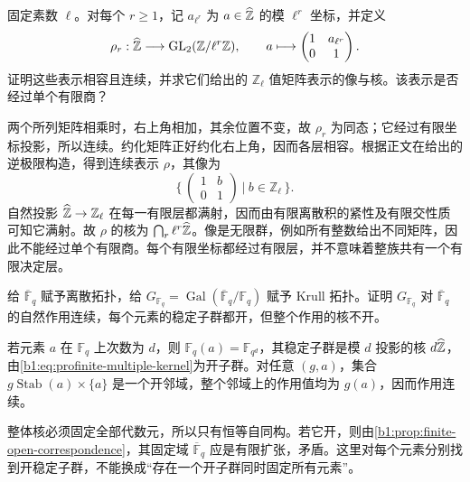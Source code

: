\begin{exercise}\label{b1:ex:22-15}
	固定素数 \(\ell\)。对每个 \(r\geq1\)，记 \(a_{\ell^r}\) 为 \(a\in\widehat{\vphantom{Z}\mathbb Z}\) 的模 \(\ell^r\) 坐标，并定义
	\[
		\rho_r:\widehat{\vphantom{Z}\mathbb Z}\longrightarrow \operatorname{GL}_2(\mathbb Z/\ell^r\mathbb Z),\qquad
		a\longmapsto\begin{pmatrix}1&a_{\ell^r}\\0&1\end{pmatrix}.
	\]
	证明这些表示相容且连续，并求它们给出的 \(\mathbb Z_\ell\) 值矩阵表示的像与核。该表示是否经过单个有限商？
\end{exercise}
\begin{solution}
	两个所列矩阵相乘时，右上角相加，其余位置不变，故 \(\rho_r\) 为同态；它经过有限坐标投影，所以连续。约化矩阵正好约化右上角，因而各层相容。根据正文在给出的逆极限构造，得到连续表示 \(\rho\)，其像为
	\[
		\Biggl\{\,\begin{pmatrix}1&b\\0&1\end{pmatrix}\ \Bigg|\ b\in\mathbb Z_\ell\,\Biggr\}.
	\]
	自然投影 \(\widehat{\vphantom{Z}\mathbb Z}\rightarrow\mathbb Z_\ell\) 在每一有限层都满射，因而由有限离散积的紧性及有限交性质可知它满射。故 \(\rho\) 的核为 \(\bigcap_r\ell^r\widehat{\vphantom{Z}\mathbb Z}\)。像是无限群，例如所有整数给出不同矩阵，因此不能经过单个有限商。每个有限坐标都经过有限层，并不意味着整族共有一个有限决定层。
\end{solution}

\begin{exercise}\label{b1:ex:22-16}
	给 \(\overline{\mathbb F}_q\) 赋予离散拓扑，给 \(G_{\mathbb F_q}=\operatorname{Gal}(\overline{\mathbb F}_q/\mathbb F_q)\) 赋予 Krull 拓扑。证明 \(G_{\mathbb F_q}\) 对 \(\overline{\mathbb F}_q\) 的自然作用连续，每个元素的稳定子群都开，但整个作用的核不开。
\end{exercise}
\begin{solution}
	若元素 \(a\) 在 \(\mathbb F_q\) 上次数为 \(d\)，则 \(\mathbb F_q(a)=\mathbb F_{q^d}\)，其稳定子群是模 \(d\) 投影的核 \(d\widehat{\vphantom{Z}\mathbb Z}\)，由\eqref{b1:eq:profinite-multiple-kernel}为开子群。对任意 \((g,a)\)，集合 \(g\operatorname{Stab}(a)\times\{a\}\) 是一个开邻域，整个邻域上的作用值均为 \(g(a)\)，因而作用连续。

	整体核必须固定全部代数元，所以只有恒等自同构。若它开，则由\cref{b1:prop:finite-open-correspondence}，其固定域 \(\overline{\mathbb F}_q\) 应是有限扩张，矛盾。这里对每个元素分别找到开稳定子群，不能换成“存在一个开子群同时固定所有元素”。
\end{solution}

